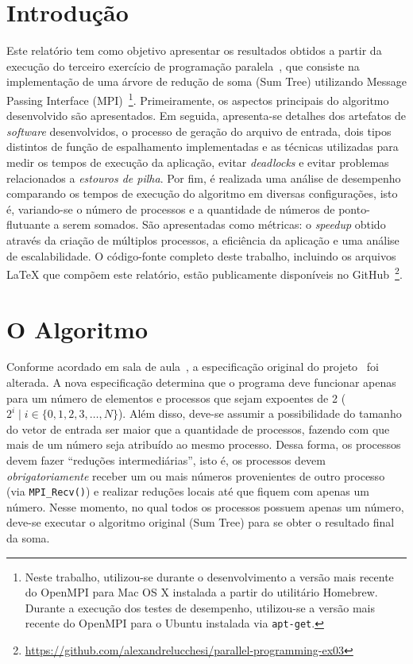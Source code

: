 \documentclass[12pt,a4paper]{article}
\begin{document}


\section{Introdução}
Este relatório tem como objetivo apresentar os resultados obtidos a partir da
execução do terceiro exercício de programação paralela~\cite{exercise}, que
consiste na implementação de uma árvore de redução de soma (Sum Tree) utilizando
Message Passing Interface (MPI)~\footnote{Neste trabalho, utilizou-se durante o
desenvolvimento a versão mais recente do OpenMPI para Mac OS X instalada a
partir do utilitário Homebrew. Durante a execução dos testes de desempenho,
utilizou-se a versão mais recente do OpenMPI para o Ubuntu instalada via
\texttt{apt-get}.}.  Primeiramente, os aspectos principais do algoritmo
desenvolvido são apresentados. Em seguida, apresenta-se detalhes dos artefatos
de \textit{software} desenvolvidos, o processo de geração do arquivo de entrada,
dois tipos distintos de função de espalhamento implementadas e as técnicas
utilizadas para medir os tempos de execução da aplicação, evitar
\textit{deadlocks} e evitar problemas relacionados a \emph{estouros de pilha}.
Por fim, é realizada uma análise de desempenho comparando os tempos de execução
do algoritmo em diversas configurações, isto é, variando-se o número de
processos e a quantidade de números de ponto-flutuante a serem somados. São
apresentadas como métricas: o \textit{speedup} obtido através da criação de
múltiplos processos, a eficiência da aplicação e uma análise de escalabilidade.
O código-fonte completo deste trabalho, incluindo os arquivos \LaTeX\xspace que
compõem este relatório, estão publicamente disponíveis no
GitHub~\footnote{\url{https://github.com/alexandrelucchesi/parallel-programming-ex03}}.


\section{O Algoritmo}
\label{sec:algorithm}
Conforme acordado em sala de aula~\cite{class-notes}, a especificação original
do projeto~\cite{exercise} foi alterada. A nova especificação determina que o
programa deve funcionar apenas para um número de elementos e processos que sejam
expoentes de 2 ($2^i \mid i \in \{0,1,2,3,\ldots,N\}$). Além disso, deve-se
assumir a possibilidade do tamanho do vetor de entrada ser maior que a
quantidade de processos, fazendo com que mais de um número seja atribuído ao
mesmo processo. Dessa forma, os processos devem fazer ``reduções
intermediárias'', isto é, os processos devem \emph{obrigatoriamente} receber um
ou mais números provenientes de outro processo (via \texttt{MPI\_Recv()}) e
realizar reduções locais até que fiquem com apenas um número. Nesse momento, no
qual todos os processos possuem apenas um número, deve-se executar o algoritmo
original (Sum Tree) para se obter o resultado final da soma.
\end{document}
